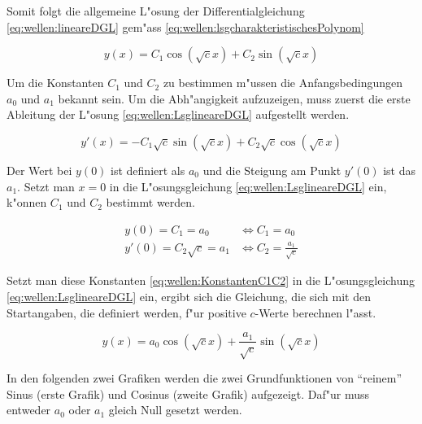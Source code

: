 Somit folgt die allgemeine L"osung der Differentialgleichung 
\ref{eq:wellen:lineareDGL} gem"ass \ref{eq:wellen:lsgcharakteristischesPolynom}

\begin{equation}
	y(x) = C_1 \cos(\sqrt{c}x) + C_2 \sin(\sqrt{c}x)
	\label{eq:wellen:LsglineareDGL}
\end{equation}

Um die Konstanten $C_1$ und $C_2$ zu bestimmen m"ussen die Anfangsbedingungen 
$a_0$ und $a_1$ bekannt sein. Um die Abh"angigkeit aufzuzeigen, muss zuerst die 
erste Ableitung der L"osung \ref{eq:wellen:LsglineareDGL} aufgestellt werden.

\begin{equation}
	y'(x)=-C_1 \sqrt{c} \sin(\sqrt{c}x) + C_2 \sqrt{c} \cos(\sqrt{c}x)
\end{equation}

Der Wert bei $y(0)$ ist definiert als $a_0$ und die Steigung am Punkt $y'(0)$ 
ist das $a_1$. Setzt man $x=0$ in die L"osungsgleichung 
\ref{eq:wellen:LsglineareDGL} ein, k"onnen $C_1$ und $C_2$ bestimmt werden.

\begin{equation}
	\begin{split}
		y(0) = C_1 = a_0 &\Leftrightarrow C_1 = a_0 \\
		y'(0) = C_2 \sqrt{c} = a_1 &\Leftrightarrow C_2 = \frac{a_1}{\sqrt{c}}
	\end{split}
	\label{eq:wellen:KonstantenC1C2}
\end{equation}

Setzt man diese Konstanten \ref{eq:wellen:KonstantenC1C2} in die 
L"osungsgleichung \ref{eq:wellen:LsglineareDGL} 
ein, ergibt sich die Gleichung, die sich mit den Startangaben, die definiert 
werden, f"ur positive $c$-Werte berechnen l"asst.

\begin{equation}
	y(x) = a_0 \cos(\sqrt{c}x) + \frac{a_1}{\sqrt{c}} \sin(\sqrt{c}x)
	\label{eq:wellen:LSGleichung}
\end{equation}

In den folgenden zwei Grafiken werden die zwei Grundfunktionen von ``reinem''
Sinus (erste Grafik) und Cosinus (zweite Grafik) aufgezeigt. Daf"ur muss 
entweder $a_0$ oder $a_1$ gleich Null gesetzt werden.

